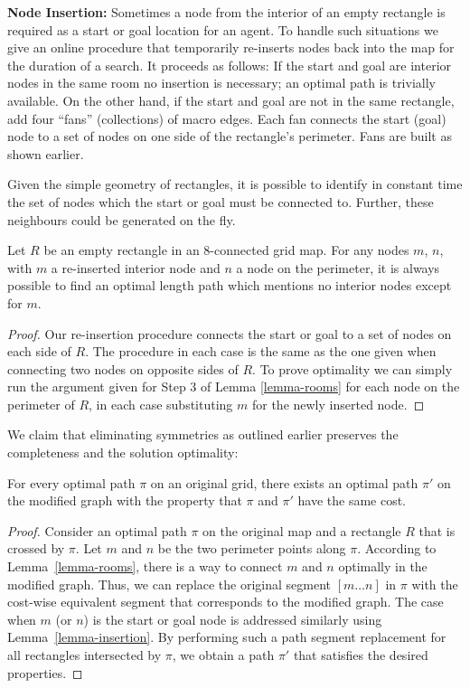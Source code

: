 \noindent
\textbf{Node Insertion:}
Sometimes a node from the interior of an empty rectangle is required as a start
or goal location for an agent.  To handle such situations we give an online
procedure that temporarily re-inserts nodes back into the map for the duration
of a search.  It proceeds as follows: {If the start and goal are interior nodes
in the same room no insertion is necessary; an optimal path is trivially
available. } {On the other hand, if the start and goal are not in the same
rectangle, add four ``fans'' (collections) of macro edges.  Each fan connects
the start (goal) node to a set of nodes on one side of the rectangle's
perimeter.  Fans are built as shown earlier.}

Given the simple geometry of rectangles, it is possible to identify in constant
time the set of nodes which the start or goal must be connected to.  Further,
these neighbours could be generated on the fly.

\begin{lemma}
\label{lemma-insertion}
Let $R$ be an empty rectangle in an 8-connected grid map.  For any
nodes $m$, $n$, with $m$ a re-inserted interior node and $n$ a node on the
perimeter, it is always possible to find an optimal length path which mentions
no interior nodes except for $m$.
\end{lemma}
\begin{proof}
Our re-insertion procedure connects the start or goal to a set of nodes on each
side of $R$.  The procedure in each case is the same as the one given when
connecting two nodes on opposite sides of $R$.  To prove optimality we can
simply run the argument given for Step 3 of Lemma \ref{lemma-rooms} for each
node on the perimeter of $R$, in each case substituting $m$ for the newly
inserted node.
\end{proof}

We claim that eliminating symmetries as outlined earlier
preserves the completeness and the solution optimality:
\begin{theorem}
For every optimal path $\pi$ on an original grid, there exists an optimal path
$\pi'$ on the modified graph with the property that $\pi$ and $\pi'$ have the
same cost.
\end{theorem}
\begin{proof}
Consider an optimal path $\pi$ on the original map and a rectangle $R$ that is
crossed by $\pi$.  Let $m$ and $n$ be the two perimeter points along $\pi$.
According to Lemma~\ref{lemma-rooms}, there is a way to connect $m$ and $n$
optimally in the modified graph. Thus, we can replace the original segment $[m
\dots n]$ in $\pi$ with the cost-wise equivalent segment that corresponds to the
modified graph.  The case when $m$ (or $n$) is the start or goal node is
addressed similarly using Lemma~\ref{lemma-insertion}.  By performing such a
path segment replacement for all rectangles intersected by $\pi$, we obtain a
path $\pi'$ that satisfies the desired properties.
\end{proof}

